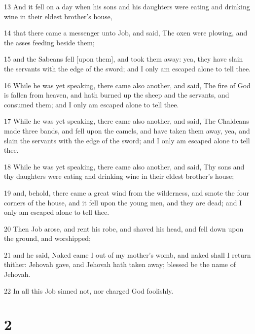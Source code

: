 \par 13 And it fell on a day when his sons and his daughters were eating and drinking wine in their eldest brother's house,
\par 14 that there came a messenger unto Job, and said, The oxen were plowing, and the asses feeding beside them;
\par 15 and the Sabeans fell [upon them], and took them away: yea, they have slain the servants with the edge of the sword; and I only am escaped alone to tell thee.
\par 16 While he was yet speaking, there came also another, and said, The fire of God is fallen from heaven, and hath burned up the sheep and the servants, and consumed them; and I only am escaped alone to tell thee.
\par 17 While he was yet speaking, there came also another, and said, The Chaldeans made three bands, and fell upon the camels, and have taken them away, yea, and slain the servants with the edge of the sword; and I only am escaped alone to tell thee.
\par 18 While he was yet speaking, there came also another, and said, Thy sons and thy daughters were eating and drinking wine in their eldest brother's house;
\par 19 and, behold, there came a great wind from the wilderness, and smote the four corners of the house, and it fell upon the young men, and they are dead; and I only am escaped alone to tell thee.
\par 20 Then Job arose, and rent his robe, and shaved his head, and fell down upon the ground, and worshipped;
\par 21 and he said, Naked came I out of my mother's womb, and naked shall I return thither: Jehovah gave, and Jehovah hath taken away; blessed be the name of Jehovah.
\par 22 In all this Job sinned not, nor charged God foolishly.

\chapter{2}

